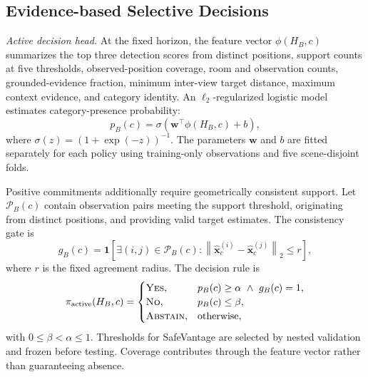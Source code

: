 \documentclass[letterpaper, 10 pt, conference]{ieeeconf}
\newcommand{\method}{SafeVantage}
\begin{document}
\subsection{Evidence-based Selective Decisions}
\label{sec:selective_decisions}

\noindent\textit{Active decision head.} At the fixed horizon, the feature vector $\phi(H_B,c)$ summarizes the top three detection scores from distinct positions, support counts at five thresholds, observed-position coverage, room and observation counts, grounded-evidence fraction, minimum inter-view target distance, maximum context evidence, and category identity. An $\ell_2$-regularized logistic model estimates category-presence probability:
\begin{equation}
p_B(c)=\sigma\!\left(\mathbf{w}^{\top}\phi(H_B,c)+b\right),
\label{eq:presence_probability}
\end{equation}
where $\sigma(z)=(1+\exp(-z))^{-1}$. The parameters $\mathbf{w}$ and $b$ are fitted separately for each policy using training-only observations and five scene-disjoint folds.

Positive commitments additionally require geometrically consistent support. Let $\mathcal{P}_B(c)$ contain observation pairs meeting the support threshold, originating from distinct positions, and providing valid target estimates. The consistency gate is
\begin{equation}
g_B(c)=\mathbf{1}\!\left[
\exists(i,j)\in\mathcal{P}_B(c):
\left\|\hat{\mathbf{x}}_c^{(i)}-\hat{\mathbf{x}}_c^{(j)}\right\|_2\leq r
\right],
\label{eq:pair_gate}
\end{equation}
where $r$ is the fixed agreement radius. The decision rule is
\begin{equation}
\pi_{\mathrm{active}}(H_B,c)=
\begin{cases}
\textsc{Yes}, & p_B(c)\geq\alpha\ \land\ g_B(c)=1,\\
\textsc{No}, & p_B(c)\leq\beta,\\
\textsc{Abstain}, & \text{otherwise},
\end{cases}
\label{eq:active_decision}
\end{equation}
with $0\leq\beta<\alpha\leq1$. Thresholds for \method{} are selected by nested validation and frozen before testing. Coverage contributes through the feature vector rather than guaranteeing absence.
\end{document}
